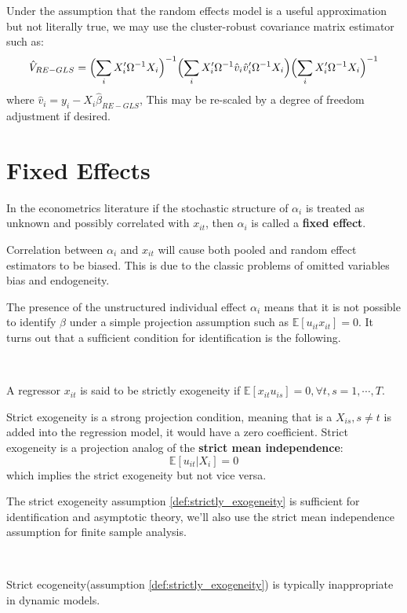 Under the assumption that the random effects model is a useful approximation but not literally true, 
we may use the cluster-robust covariance matrix estimator such as:
\begin{gather*}
    \hat{V}_{RE-GLS} = \Bigl(\sum_{i} X_i^{\prime} \Omega^{-1} X_i\Bigr)^{-1} \Bigl( \sum_{i} X_i^{\prime} \Omega^{-1} \hat{v}_i \hat{v}_i^{\prime} \Omega^{-1} X_i \Bigr) \Bigl( \sum_{i} X_i^{\prime} \Omega^{-1} X_i \Bigr)^{-1} 
\end{gather*}
where $\hat{v}_i = y_i - X_i \hat{\beta}_{RE-GLS}$, This may be re-scaled by a degree of freedom adjustment if desired.

\section{Fixed Effects}
In the econometrics literature if the stochastic structure of $\alpha_i$ is treated as unknown
and possibly correlated with $x_{it}$, then $\alpha_i$ is called a \textbf{fixed effect}.

Correlation between $\alpha_i$ and $x_{it}$ will cause both pooled and random effect estimators to be biased.
This is due to the classic problems of omitted variables bias and endogeneity.

The presence of the unstructured individual effect $\alpha_i$ means that it is not possible to identify $\beta$ under a simple projection assumption such as $\mathbb{E}[u_{it} x_{it}] = 0$.
It turns out that a sufﬁcient condition for identiﬁcation is the following.

\begin{definition}\label{def:strictly_exogeneity}
    \

    A regressor $x_{it}$ is said to be strictly exogeneity if $\mathbb{E}[x_{it} u_{is}] = 0, \forall t, s = 1, \cdots, T$.
\end{definition}
Strict exogeneity is a strong projection condition,  meaning that is a $X_{is}, s \neq t$ is added into the regression model,
it would have a zero coefficient. Strict exogeneity is a projection analog of the \textbf{strict mean independence}\label{FE:SMI}:
\[\mathbb{E}[u_{it} | X_i] = 0\] 
which implies the strict exogeneity but not vice versa.

The strict exogeneity assumption \ref{def:strictly_exogeneity} is sufficient for identification and
asymptotic theory, we'll also use the strict mean independence assumption for finite sample analysis.

\begin{remark}
    \

    Strict ecogeneity(assumption \ref{def:strictly_exogeneity}) is typically inappropriate in dynamic models.
\end{remark}

